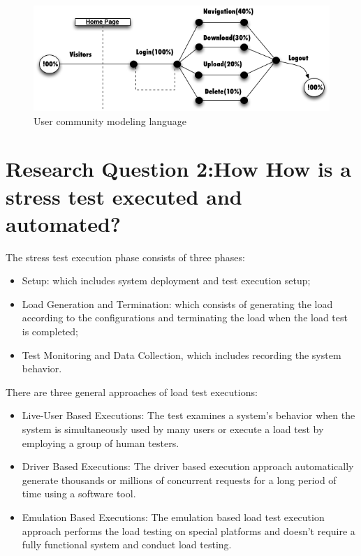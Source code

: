 \begin{figure}[!ht]
\centering
\includegraphics[width=1\textwidth]{./images/ucml.png}
\caption{User community modeling language \cite{Wang2013}}
\label{fig:ucml}

\end{figure}




\section{Research Question 2:How How is a stress test executed and automated?}

The stress test execution phase consists of three phases:

\begin{itemize}
\item  Setup: which includes system deployment and test execution setup;
\item Load Generation and Termination: which consists of generating the load according to the configurations and terminating the load when the load test is completed;
\item Test Monitoring and Data Collection, which includes recording the system behavior.
\end{itemize}
 
 
There are three general approaches of load test executions:

\begin{itemize}
\item Live-User Based Executions: The test examines a system’s behavior when the system is simultaneously used by many users or execute a load test by employing a group of human testers. 
\item Driver Based Executions: The driver based execution approach automatically generate thousands or millions of concurrent requests for a long period of time using a software tool.
\item Emulation Based Executions: The emulation based load test execution approach performs the load testing on special platforms and doesn't require a fully functional system and conduct load testing.
\end{itemize}


